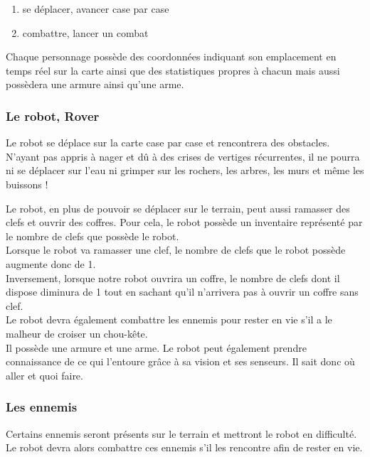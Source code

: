 \documentclass[a4paper 12pts]{article}
\begin{document}
\begin{enumerate}
	\item se déplacer, avancer case par case 
	\item combattre, lancer un combat
\end{enumerate}

\vspace{0.5cm}

Chaque personnage possède des coordonnées indiquant son emplacement en temps réel sur la carte ainsi que des statistiques propres à chacun mais aussi possèdera une armure ainsi qu'une arme.

\newpage
\subsubsection{Le robot, Rover}
\vspace{1cm}

Le robot se déplace sur la carte case par case et rencontrera des obstacles.
N'ayant pas appris à nager et dû à des crises de vertiges récurrentes, il ne pourra ni se déplacer sur l'eau ni grimper sur les rochers,
les arbres, les murs et même les buissons !

Le robot, en plus de pouvoir se déplacer sur le terrain, peut aussi ramasser des clefs et ouvrir des coffres.
Pour cela, le robot possède un inventaire représenté par le nombre de clefs que possède le robot.\\
Lorsque le robot va ramasser une clef, le nombre de clefs que le robot possède augmente donc de 1.\\
Inversement, lorsque notre robot ouvrira un coffre, le nombre de clefs dont il dispose diminura de 1 tout en sachant qu'il n'arrivera pas à ouvrir un coffre sans clef.\\
Le robot devra également combattre les ennemis pour rester en vie s'il a le malheur de croiser un chou-kête.\\
Il possède une armure et une arme.
Le robot peut également prendre connaissance de ce qui l'entoure grâce à sa vision et ses senseurs. Il sait donc où aller et quoi faire.

\vspace{0.75cm}

\subsubsection{Les ennemis}


Certains ennemis seront présents sur le terrain et mettront le robot en difficulté. 
Le robot devra alors combattre ces ennemis s'il les rencontre afin de rester en vie.
\end{document}
